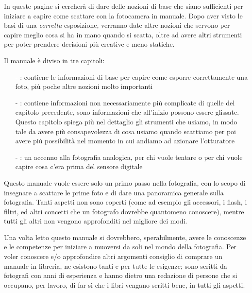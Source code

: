 In queste pagine si cercherà di dare delle nozioni di base che siano sufficienti per iniziare a capire come scattare con la fotocamera in manuale.
Dopo aver visto le basi di una \textit{corretta} esposizione, verranno date altre nozioni che servono per capire meglio cosa si ha in mano quando si scatta, oltre ad avere altri strumenti per poter prendere decisioni più creative e meno statiche.

Il manuale è diviso in tre capitoli:
\begin{itemize}
    \item[-] \textbf{}: contiene le informazioni di base per capire come esporre correttamente una foto, più poche altre nozioni molto importanti
    \item[-] \textbf{}: contiene informazioni non necessariamente più complicate di quelle del capitolo precedente, sono informazioni che all'inizio possono essere glissate. Questo capitolo spiega più nel dettaglio gli strumenti che usiamo, in modo tale da avere più consapevolezza di cosa usiamo quando scattiamo per poi avere più possibilità nel momento in cui andiamo ad azionare l'otturatore
    \item[-] \textbf{}: un accenno alla fotografia analogica, per chi vuole tentare o per chi vuole capire cosa c'era prima del sensore digitale
\end{itemize}

Questo manuale vuole essere solo un primo passo nella fotografia, con lo scopo di insegnare a scattare le prime foto e di dare una panoramica generale sulla fotografia.
Tanti aspetti non sono coperti (come ad esempio gli accessori, i flash, i filtri, ed altri concetti che un fotografo dovrebbe quantomeno conoscere), mentre tutti gli altri non vengono approfonditi nel migliore dei modi.

Una volta letto questo manuale si dovrebbero, sperabilmente, avere le conoscenze e le competenze per iniziare a muoversi da soli nel mondo della fotografia.
Per voler conoscere e/o approfondire altri argomenti consiglio di comprare un manuale in libreria, ne esistono tanti e per tutte le esigenze; sono scritti da fotografi con anni di esperienza e hanno dietro una redazione di persone che si occupano, per lavoro, di far sì che i libri vengano scritti bene, in tutti gli aspetti.